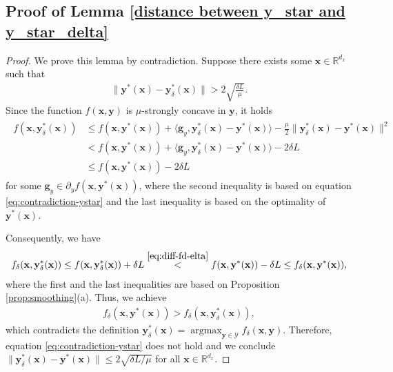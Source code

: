 \documentclass[11pt]{article}
\def\vg{\mathbf{g}}
\def\vx{\mathbf{x}}
\def\vy{\mathbf{y}}
\def\fY{{\mathcal{Y}}}
\def\BR{{\mathbb{R}}}
\DeclareMathOperator*{\argmax}{argmax}
\begin{document}
\subsection{Proof of Lemma \ref{distance between y_star and y_star_delta}}
\begin{proof}
    We prove this lemma by contradiction. 
    Suppose there exists some $\vx\in\BR^{d_x}$ such that
    \begin{align}\label{eq:contradiction-ystar}
        \|\vy^*(\vx)-\vy_\delta^*(\vx)\|> 2\sqrt{\frac{\delta L}{\mu}}.    
    \end{align}     
    Since the function $f(\vx,\vy)$ is $\mu$-strongly concave in $\vy$, it holds
    \begin{align}\label{eq:diff-fd-elta}
    \begin{split}        
    f(\vx,\vy_\delta^*(\vx))&\le f(\vx,\vy^*(\vx))+\langle \vg_y, \vy_\delta^*(\vx)-\vy^*(\vx)\rangle-\frac{\mu}{2}\|\vy_\delta^*(\vx)-\vy^*(\vx)\|^2 \\
    &< f(\vx,\vy^*(\vx))+\langle \vg_y, \vy_\delta^*(\vx)-\vy^*(\vx)\rangle-2\delta L \\
    & \leq f(\vx,\vy^*(\vx))-2\delta L
    \end{split}
    \end{align}
    for some $\vg_y\in \partial_y f(\vx,\vy^*(\vx))$, where the second inequality is based on equation \eqref{eq:contradiction-ystar} and the last inequality is based on the optimality of $\vy^*(\vx)$.
    
    Consequently, we have
    \begin{align*}
      f_\delta(\vx,\vy_\delta^*(\vx))\leq f(\vx,\vy_\delta^*(\vx))+\delta L \overset{\eqref{eq:diff-fd-elta}}< f(\vx,\vy^*(\vx))-\delta L\le f_\delta(\vx,\vy^*(\vx)),  
    \end{align*}
    where the first and the last inequalities are based on Proposition \ref{prop:smoothing}(a).
    Thus, we achieve 
    \begin{align*}
        f_\delta(\vx,\vy^*(\vx))>f_\delta(\vx,\vy_\delta^*(\vx)),
    \end{align*}
    which contradicts the definition  $\vy_\delta^*(\vx)=\argmax_{\vy\in\fY} f_\delta(\vx,\vy)$.    
    Therefore, equation \eqref{eq:contradiction-ystar} does not hold and we conclude $\|\vy_\delta^*(\vx)-\vy^*(\vx)\|\leq 2\sqrt{\delta L/\mu}$ for all $\vx\in\BR^{d_x}$.    

\end{proof}
\end{document}
